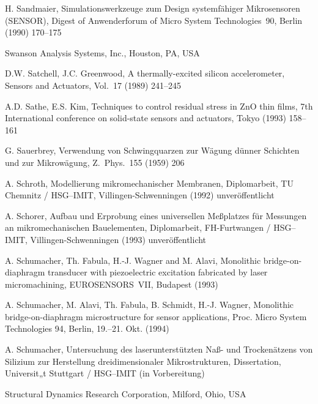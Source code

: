\begin{thebibliography}{xxx}
 H. Sandmaier, Simulationswerkzeuge zum Design systemfähiger Mikrosensoren
 ({\sf SENSOR}), Digest of Anwenderforum of Micro System Technologies~90,
 Berlin (1990) 170--175

 Swanson Analysis Systems, Inc., Houston, PA, USA

 D.W. Satchell, J.C. Greenwood, A thermally-excited silicon accelerometer,
 Sensors and Actuators, Vol.~17 (1989) 241--245

 A.D. Sathe, E.S. Kim, Techniques to control residual stress in ZnO thin
 films, 7th International conference on solid-state sensors and actuators,
 Tokyo (1993) 158--161

 G. Sauerbrey, Verwendung von Schwingquarzen zur Wägung dünner Schichten und
 zur Mikrowägung, Z.~Phys.~155 (1959) 206


 A. Schroth, Modellierung mikromechanischer Membranen, Diplomarbeit,
 TU Chemnitz / HSG--IMIT, Villingen-Schwenningen (1992) unveröffentlicht

 A. Schorer, Aufbau und Erprobung eines universellen Meßplatzes für
 Messungen an mikromechanischen Bauelementen, Diplomarbeit,
 FH-Furtwangen / HSG--IMIT, Villingen-Schwenningen (1993) unveröffentlicht

 A. Schumacher, Th. Fabula, H.-J. Wagner and M. Alavi,
 Monolithic bridge-on-diaphragm transducer with piezoelectric excitation
 fabricated by laser micromachining, EUROSENSORS~VII, Budapest (1993)

 A. Schumacher, M. Alavi, Th. Fabula, B. Schmidt, H.-J. Wagner,
 Monolithic bridge-on-diaphragm microstructure for sensor applications,
 Proc. Micro System Technologies 94, Berlin, 19.--21. Okt. (1994)

 A. Schumacher, Untersuchung des laserunterstützten Naß- und Trockenätzens
 von Silizium zur Herstellung dreidimensionaler Mikrostrukturen,
 Dissertation, Universit„t Stuttgart / HSG--IMIT (in Vorbereitung)

 Structural Dynamics Research Corporation, Milford, Ohio, USA


\end{thebibliography}
